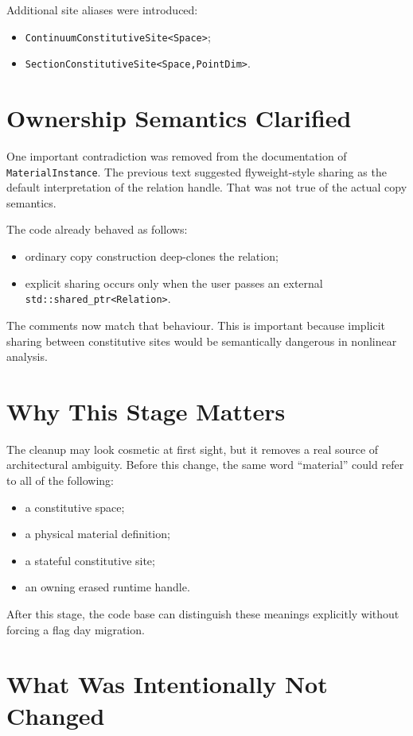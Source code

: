 Additional site aliases were introduced:
\begin{itemize}
  \item \texttt{ContinuumConstitutiveSite<Space>};
  \item \texttt{SectionConstitutiveSite<Space,PointDim>}.
\end{itemize}

\section{Ownership Semantics Clarified}

One important contradiction was removed from the documentation of
\texttt{MaterialInstance}.  The previous text suggested flyweight-style sharing
as the default interpretation of the relation handle.  That was not true of the
actual copy semantics.

The code already behaved as follows:
\begin{itemize}
  \item ordinary copy construction deep-clones the relation;
  \item explicit sharing occurs only when the user passes an external
        \texttt{std::shared\_ptr<Relation>}.
\end{itemize}

The comments now match that behaviour.  This is important because implicit
sharing between constitutive sites would be semantically dangerous in nonlinear
analysis.

\section{Why This Stage Matters}

The cleanup may look cosmetic at first sight, but it removes a real source of
architectural ambiguity.  Before this change, the same word ``material'' could
refer to all of the following:
\begin{itemize}
  \item a constitutive space;
  \item a physical material definition;
  \item a stateful constitutive site;
  \item an owning erased runtime handle.
\end{itemize}

After this stage, the code base can distinguish these meanings explicitly
without forcing a flag day migration.

\section{What Was Intentionally Not Changed}

